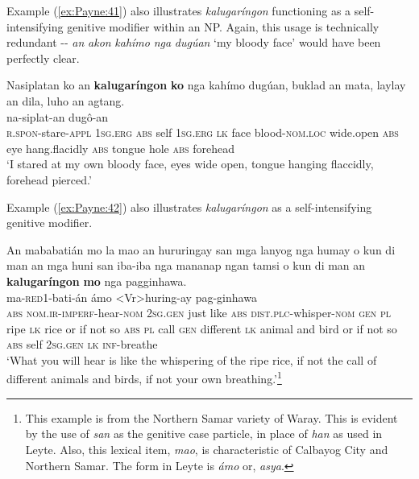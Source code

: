 \documentclass[output=paper]{langscibook}
\begin{document}
Example (\ref{ex:Payne:41}) also illustrates \textit{kalugaríngon} functioning as a self-intensifying genitive modifier within an NP. Again, this usage is technically redundant -{}- \textit{an} \textit{akon} \textit{kahímo} \textit{nga} \textit{dugúan} ‘my bloody face' would have been perfectly clear.

\ea
\label{ex:Payne:41}
\glll
Nasiplatan ko an \textbf{kalugaríngon} \textbf{ko} nga kahímo dugúan, buklad an mata, laylay an dila, luho an agtang.\\
na-siplat-an { } { } { } { } { } { } dugô-an { } { } { } { } { } { } { } { } { }\\
\textsc{r.spon}{}-stare-\textsc{appl} 1\textsc{sg.erg} \textsc{abs} self 1\textsc{sg.erg} \textsc{lk} face blood-\textsc{nom.loc} wide.open \textsc{abs} eye hang.flacidly \textsc{abs} tongue hole \textsc{abs} forehead\\
\glt ‘I stared at my own bloody face, eyes wide open, tongue hanging flaccidly, forehead pierced.'
\z

Example (\ref{ex:Payne:42}) also illustrates \textit{kalugaríngon} as a self-intensifying genitive modifier.

\ea
\label{ex:Payne:42}
\glll
An mababatián mo la mao an hururingay san mga lanyog nga humay o kun di man an mga huni san iba-iba nga mananap ngan tamsi o kun di man an \textbf{kalugaríngon} \textbf{mo} nga pagginhawa.\\
{ } ma-\textsc{red}1-bati-án { } { } ámo { } <Vr>huring-ay { } { } { } { } { } { } { } { } { } { } { } { } { } { } { } { } { } { } { } { } { } { } { } { } { } { } pag-ginhawa\\
\textsc{abs} \textsc{nom.ir-imperf}-hear-\textsc{nom} 2\textsc{sg.gen} just like \textsc{abs} \textsc{dist.plc}-whisper-\textsc{nom}
\textsc{gen} \textsc{pl} ripe \textsc{lk} rice or if not so \textsc{abs} \textsc{pl} call \textsc{gen} different \textsc{lk} animal and bird or if not so \textsc{abs} self 2\textsc{sg.gen} \textsc{lk} \textsc{inf}-breathe\\
\glt ‘What you will hear is like the whispering of the ripe rice, if not the call of different animals and birds, if not your own breathing.'\footnote{This example is from the Northern Samar variety of Waray. This is evident by the use of \textit{san} as the genitive case particle, in place of \textit{han} as used in Leyte. Also, this lexical item, \textit{mao}, is characteristic of Calbayog City and Northern Samar. The form in Leyte is \textit{ámo} or, \textit{asya}.}
\z
\end{document}
